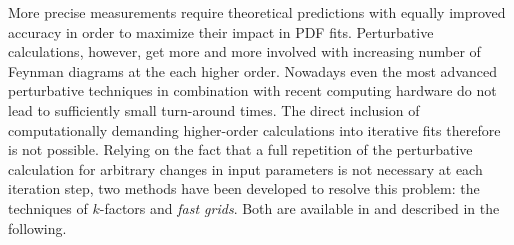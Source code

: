 More precise measurements
require theoretical predictions with equally improved accuracy in
order to maximize their impact in PDF fits.  Perturbative
calculations, however, get more and more involved with increasing
number of Feynman diagrams at the each higher order. 
Nowadays even the most advanced perturbative techniques in
combination with recent computing hardware do not lead to sufficiently
small turn-around times. The direct inclusion of computationally
demanding higher-order calculations into iterative fits therefore is
not possible. Relying on the fact that a full repetition of the
perturbative calculation for arbitrary changes in input parameters is
not necessary at each iteration step, two methods have been developed
to resolve this problem: the techniques of $k$-factors and
\emph{fast grids}. Both are available in \fitter and described in the following.

